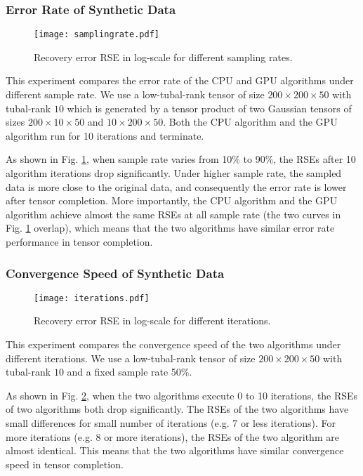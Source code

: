 \documentclass[format=acmsmall, review=false, screen=true]{acmart}
\begin{document}
\subsubsection{Error Rate of Synthetic Data}
\begin{figure}[t]
    \centering
    \texttt{[image: samplingrate.pdf]}
    \caption{Recovery error RSE in log-scale for different sampling rates.}
    \label{pic_samplingrate}
\end{figure}
This experiment compares the error rate of the CPU and GPU algorithms under different sample rate. We use a low-tubal-rank tensor of size $200 \times 200 \times 50$ with tubal-rank $10$ which is generated by a tensor product of two Gaussian tensors of sizes $200 \times 10 \times 50$ and $10 \times 200 \times 50$. Both the CPU algorithm and the GPU algorithm run for 10 iterations and terminate.

As shown in Fig. \ref{pic_samplingrate}, when sample rate varies from 10\% to 90\%, the RSEs after 10 algorithm iterations drop significantly. Under higher sample rate, the sampled data is more close to the original data,  and consequently the error rate is lower after tensor completion. More importantly, the CPU algorithm and the GPU algorithm achieve almost the same RSEs at all sample rate (the two curves in Fig. \ref{pic_samplingrate} overlap), which means that the two algorithms have similar error rate performance in tensor completion.


\subsubsection{Convergence Speed of Synthetic Data}
\begin{figure}[t]
    \centering
    \texttt{[image: iterations.pdf]}
    \caption{Recovery error RSE in log-scale for different iterations.}
    \label{pic_iterations}
\end{figure}
This experiment compares the convergence speed of the two algorithms under different iterations. We use a low-tubal-rank tensor of size $200 \times 200 \times 50$ with tubal-rank $10$ and a fixed sample rate 50\%.

As shown in Fig. \ref{pic_iterations}, when the two algorithms execute 0 to 10 iterations, the RSEs of two algorithms both drop significantly. The RSEs of the two algorithms have small differences for small number of iterations (e.g. 7 or less iterations). For more iterations (e.g. 8 or more iterations), the RSEs of the two algorithm are almost identical. This means that the two algorithms have similar convergence speed in tensor completion.
\end{document}
